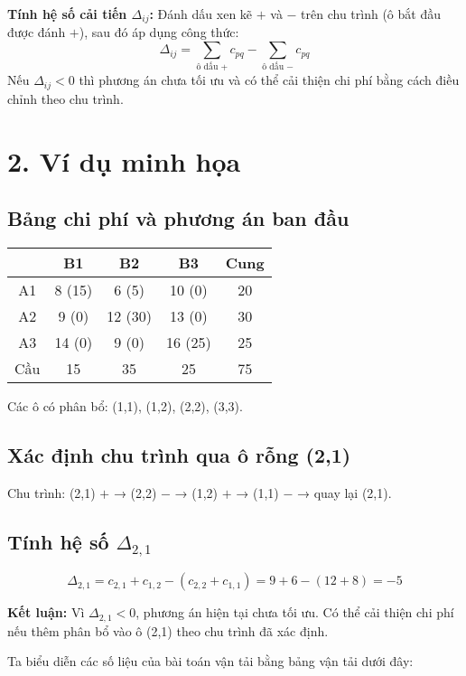 \textbf{Tính hệ số cải tiến $\Delta_{ij}$:} Đánh dấu xen kẽ $+$ và $-$ trên chu trình (ô bắt đầu được đánh $+$), sau đó áp dụng công thức:
\[
\Delta_{ij} = \sum_{\text{ô dấu }+} c_{pq} - \sum_{\text{ô dấu }-} c_{pq}
\]
Nếu $\Delta_{ij} < 0$ thì phương án chưa tối ưu và có thể cải thiện chi phí bằng cách điều chỉnh theo chu trình.

\section*{2. Ví dụ minh họa}

\subsection*{Bảng chi phí và phương án ban đầu}

\begin{center}
\begin{tabular}{c|ccc|c}
     & B1 & B2 & B3 & Cung \\ \hline
A1 & 8 (15) & 6 (5)  & 10 (0) & 20 \\
A2 & 9 (0)  & 12 (30) & 13 (0) & 30 \\
A3 & 14 (0) & 9 (0)  & 16 (25) & 25 \\ \hline
Cầu & 15 & 35 & 25 & 75 \\
\end{tabular}
\end{center}

Các ô có phân bổ: (1,1), (1,2), (2,2), (3,3).

\subsection*{Xác định chu trình qua ô rỗng (2,1)}
Chu trình: (2,1) $+$ → (2,2) $-$ → (1,2) $+$ → (1,1) $-$ → quay lại (2,1).

\subsection*{Tính hệ số $\Delta_{2,1}$}
\[
\Delta_{2,1} = c_{2,1} + c_{1,2} - (c_{2,2} + c_{1,1}) = 9 + 6 - (12 + 8) = -5
\]

\textbf{Kết luận:} Vì $\Delta_{2,1} < 0$, phương án hiện tại chưa tối ưu. Có thể cải thiện chi phí nếu thêm phân bổ vào ô (2,1) theo chu trình đã xác định.

Ta biểu diễn các số liệu của bài toán vận tải bằng bảng vận tải dưới đây:

\vspace{1em}

